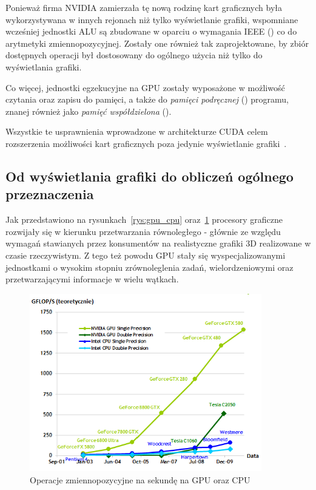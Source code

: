 Ponieważ firma NVIDIA zamierzała tę nową rodzinę kart graficznych była wykorzystywana w innych rejonach niż tylko wyświetlanie grafiki, wspomniane wcześniej jednostki ALU są zbudowane w oparciu o wymagania IEEE () co do arytmetyki zmiennopozycyjnej. Zostały one również tak zaprojektowane, by zbiór dostępnych operacji był dostosowany do ogólnego użycia niż tylko do wyświetlania grafiki. 

Co więcej, jednostki egzekucyjne na GPU zostały wyposażone w możliwość czytania oraz zapisu do pamięci, a także do \emph{pamięci podręcznej} () programu, znanej również jako \emph{pamięć współdzielona} ().

Wszystkie te usprawnienia wprowadzone w architekturze CUDA celem rozszerzenia możliwości kart graficznych poza jedynie wyświetlanie grafiki~\cite{Cuda:Example}.

\subsection{Od wyświetlania grafiki do obliczeń ogólnego przeznaczenia}
Jak przedstawiono na rysunkach~\ref{rys:gpu_cpu} oraz~\ref{rys:gpu_cpu2} procesory graficzne rozwijały się w kierunku przetwarzania równoległego - głównie ze względu wymagań stawianych przez konsumentów na realistyczne grafiki 3D realizowane w czasie rzeczywistym. Z tego też powodu GPU stały się wyspecjalizowanymi jednostkami o wysokim stopniu zrównoleglenia zadań, wielordzeniowymi oraz przetwarzającymi informacje w wielu wątkach. 

\begin{figure}[h]
\centering\includegraphics[width=0.9\textwidth]{figures/03/gpu_cpu2.png}
\caption{Operacje zmiennopozycyjne na sekundę na GPU oraz CPU~\cite{Cuda:PGuide}}\label{rys:gpu_cpu2}
\end{figure}

